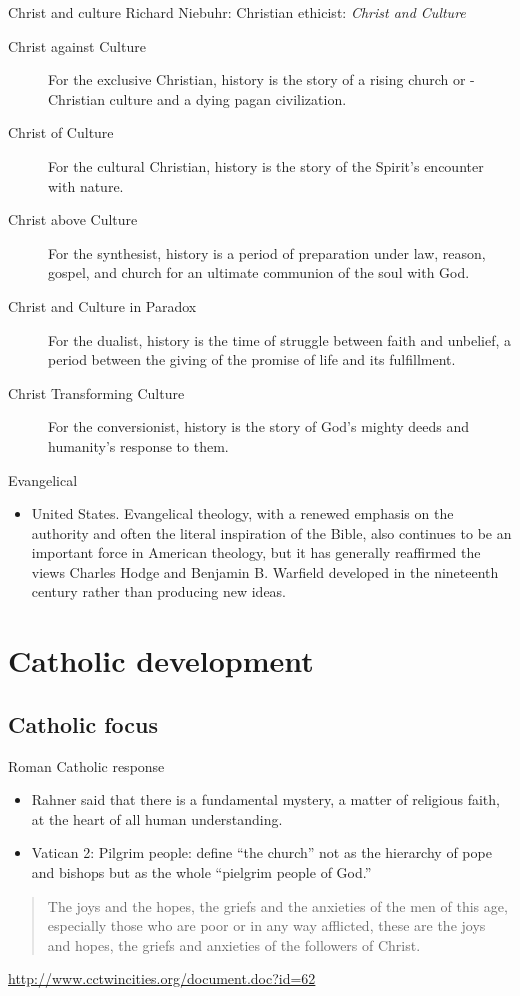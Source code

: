\begin{frame}[label=sec-1-1-3]{Christ and culture}
Richard Niebuhr: Christian ethicist: \emph{Christ and Culture}
\footnotesize
\begin{description}
\item[{Christ against Culture}] For the exclusive Christian, history is the story of a rising church or - Christian culture and a dying pagan civilization.
\item[{Christ of Culture}] For the cultural Christian, history is the story of the Spirit’s encounter with nature.
\item[{Christ above Culture}] For the synthesist, history is a period of preparation under law, reason, gospel, and church for an ultimate communion of the soul with God.
\item[{Christ and Culture in Paradox}] For the dualist, history is the time of struggle between faith and unbelief, a period between the giving of the promise of life and its fulfillment.
\item[{Christ Transforming Culture}] For the conversionist, history is the story of God’s mighty deeds and humanity’s response to them.
\end{description}
\end{frame}
\begin{frame}[label=sec-1-1-4]{Evangelical}
\begin{itemize}
\item United States. Evangelical theology, with a renewed emphasis on the authority and often the literal inspiration of the Bible, also continues to be an important force in American theology, but it has generally reaffirmed the views Charles Hodge and Benjamin B. Warfield developed in the nineteenth century rather than producing new ideas.
\end{itemize}
\end{frame}

\section{Catholic development}
\label{sec-2}
\subsection{Catholic focus}
\label{sec-2-1}
\begin{frame}[label=sec-2-1-1]{Roman Catholic response}
\begin{itemize}
\item Rahner said that there is a fundamental mystery, a matter of religious faith, at the heart of all human understanding.
\item Vatican 2: Pilgrim people: define “the church” not as the hierarchy of pope and bishops but as the whole “pielgrim people of God.”
\end{itemize}
\begin{quote}
The joys and the hopes, the griefs and the anxieties of the men of this age, especially those who are poor or in any way afflicted, these are the joys and hopes, the griefs and anxieties of the followers of Christ. 
\end{quote}
\url{http://www.cctwincities.org/document.doc?id=62}
\end{frame}

